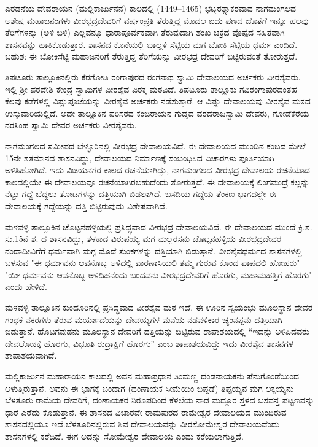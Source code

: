 ಎರಡನೆಯ ದೇವರಾಯನ (ಮಲ್ಲಿಕಾರ್ಜುನನ) ಕಾಲದಲ್ಲಿ (1449–1465) ಭಟ್ಟರತ್ನಾಕರವಾದ ನಾಗಮಂಗಲದ ಅಶೇಷ ಮಹಾಜನಂಗಳು ವೀರಭದ್ರದೇವರಿಗೆ ವರ್ಷಂಪ್ರತಿ ತೆರುತ್ತಿದ್ದ ಮೊದಲ ಐದು ಪಣದ ಜೊತೆಗೆ ಇನ್ನೂ ಹಲವು ತೆರಿಗೆಗಳನ್ನು (ಅಳಿ ಬಳಿ) ಎಲ್ಲವನ್ನೂ ಧಾರಾಪೂರ್ವಕವಾಗಿ ತೆರುವುದಾಗಿ ಶಂಖ ಚಕ್ರದ ವೊಪ್ಪದ ಸಹಿತವಾಗಿ ಶಾಸನವನ್ನು ಹಾಕಿಕೊಡುತ್ತಾರೆ. ಶಾಸನದ ಕೊನೆಯಲ್ಲಿ ಬಾಲ್ದಳಿ ಸೆಟ್ಟಿಯ ಮಗ ಬೋಕಿ ಸೆಟ್ಟಿಯ ಧರ್ಮ ಎಂದಿದೆ. ಬಹುಶ: ಈ ಬೋಕಿಸೆಟ್ಟಿ ಮಹಾಜನರಿಗೆ ತೆರುತ್ತಿದ್ದ ತೆರಿಗೆಯನ್ನು ವೀರಭದ್ರ ದೇವರಿಗೆ ಬಿಟ್ಟಿರುವಂತೆ ತೋರುತ್ತದೆ.

ತಿಪಟೂರು ತಾಲ್ಲೂಕಿನಲ್ಲಿರು ಕೆರಗೋಡಿ ರಂಗಾಪುರದ ರಂಗನಾಥ ಸ್ವಾಮಿ ದೇವಾಲಯದ ಅರ್ಚಕರು ವೀರಶೈವರು. ಇಲ್ಲಿ ಶ‍್ರೀ ಪರದೇಶಿ ಕೇಂದ್ರ ಸ್ವಾಮಿಗಳ ವೀರಶೈವ ವಿರಕ್ತ ಮಠವಿದೆ. ತಿಪಟೂರು ತಾಲ್ಲೂಕು ಗವಿರಂಗಾಪುರದಂತಹ ಕೆಲವು ಕಡೆಗಳಲ್ಲಿ ವಿಷ್ಣುಪೂಜೆಯನ್ನು ವೀರಶೈವ ಅರ್ಚಕರು ನಡೆಸುತ್ತಾರೆ. ಆ ವಿಷ್ಣು ದೇವಾಲಯವು ವೀರಶೈವ ಮಠದ ಉಸ್ತುವಾರಿಯಲ್ಲಿದೆ. ಅದೇ ತಾಲ್ಲೂಕಿನ ಪರಿಸರದ ಕಂಚಿರಾಯನ ಗುಡ್ಡದ ವರದರಾಜಸ್ವಾಮಿ ದೇವರು, ಗೋಡೆಕೆರೆಯ ನರಸಿಂಹ ಸ್ವಾಮಿ ದೇವರ ಅರ್ಚಕರು ವೀರಶೈವರು.

ನಾಗಮಂಗಲದ ಸಮೀಪದ ಬೆಳ್ಳೂರಿನಲ್ಲಿ ವೀರಭದ್ರ ದೇವಾಲಯವಿದೆ. ಈ ದೇವಾಲಯದ ಮುಂದಿನ ಕಂಬದ ಮೇಲೆ 15ನೇ ಶತಮಾನದ ಶಾಸನವಿದ್ದು, ದೇವಾಲಯದ ನಿರ್ಮಾಣಕ್ಕೆ ಸಂಬಂಧಿಸಿದ ವಿಚಾರಗಳು ಪೂರ್ತಿಯಾಗಿ ಅಳಿಸಿಹೋಗಿದೆ. ಇದು ವಿಜಯನಗರ ಕಾಲದ ರಚನೆಯಾಗಿದ್ದು, ನಾಗಮಂಗಲದ ವೀರಭದ್ರ ದೇವಾಲಯ ರಚನೆಯಾದ ಕಾಲದಲ್ಲಿಯೇ ಈ ದೇವಾಲಯವೂ ರಚನೆಯಾಗಿರಬಹುದೆಂದು ತೋರುತ್ತದೆ. ಈ ದೇವಾಲಯಕ್ಕೆ ಲಿಂಗಮುದ್ರೆ ಕಲ್ಲನ್ನು ನೆಟ್ಟು ಗದ್ದೆ ಬೆದ್ದಲು ತೋಟಗಳನ್ನು ದತ್ತಿಯಾಗಿ ಬಿಡಲಾಗಿದೆ. ಬಸದಿಯ ಗದ್ದೆಯ ತೆಂಕಣ ಭಾಗದಲ್ಲೇ ಈ ದೇವಾಲಯಕ್ಕೆ ಗದ್ದೆಯನ್ನು ದತ್ತಿ ಬಿಟ್ಟಿರುವುದು ವಿಶೇಷವಾಗಿದೆ.

ಮಳವಳ್ಳಿ ತಾಲ್ಲೂಕಿನ ಚೊಟ್ಟನಹಳ್ಳಿಯಲ್ಲಿ ಪ್ರಸಿದ್ಧವಾದ ವೀರಭದ್ರ ದೇವಾಲಯವಿದೆ. ಈ ದೇವಾಲಯದ ಮುಂದೆ ಕ್ರಿ.ಶ. ಸು.15ನೆ ಶ. ದ ಶಾಸನವಿದ್ದು, ತಳಕಾಡ ವಿರುಪಯ್ಯ ಮಗ ಮಲ್ಲರಸನು ಚೊಟ್ಟನಹಳ್ಳಿಯ ವೀರಭದ್ರದೇವರ ನಂದಾದೀವಿಗೆಗೆ ಧರ್ಮವಾಗಿ ಮಗ್ಗ ಮೊದೆ ಸುಂಕಗಳನ್ನು ದತ್ತಿಯಾಗಿ ಬಿಡುತ್ತಾನೆ. ವೀರಶೈವಧರ್ಮದ ಶಾಸನಗಳಲ್ಲಿ ಬಳಸುವ "ಈ ಧರ್ಮವನು ಆವನೊಬ್ಬ ಅಳಿದಲ್ಲಿ ವಾರಣಾಸಿಯಲಿ ತಮ್ಮ ಗುರುವ ಕೊಂದ ಪಾಪದಲಿ ಹೋಹರು" "ಯೀ ಧರ್ಮವನು ಆವನೊಬ್ಬ ಅಳಿದಿಹನೆಂದು ಬಂದವನು ವೀರಭದ್ರದೇವರಿಗೆ ಹೊರಗು, ಮಹಾಮಹತ್ತಿಗೆ ಹೊರಗು" ಎಂದು ಹೇಳಿದೆ.

ಮಳವಳ್ಳಿ ತಾಲ್ಲೂಕಿನ ಕುಂದೂರಿನಲ್ಲಿ ಪ್ರಸಿದ್ಧವಾದ ವೀರಶೈವ ಮಠ ಇದೆ. ಈ ಊರಿನ ಸ್ವಯಂಭು ಮೂಲಸ್ಥಾನ ದೇವರ ಗಂಧಕೆ ನಕರಗಳು ತೆರುವ ಮರ್ಯಾದೆಯನ್ನು ದೇವಯ್ಯಗಳ ಮನೆಯ ನಡವಳಿಕಾರ ಚ್ಯಂನಪ್ಪನು ದತ್ತಿಯಾಗಿ ಬಿಡುತ್ತಾನೆ. ಹೊಟಗವುಡನು ಮೂಲಸ್ಥಾನ ದೇವರಿಗೆ ದತ್ತಿಯನ್ನು ಬಿಟ್ಟಿರುವ ಶಾಪಾಶಯದಲ್ಲಿ “ಇದನ್ನು ಅಳಿಪಿದವರು ದೇವಲೋಕಕ್ಕೆ ಹೊರಗು, ವಿಭೂತಿ ರುದ್ರಾಕ್ಷಿಗೆ ಹೊರಗು” ಎಂಬ ಶಾಪಾಶಯವಿದ್ದು ಇದು ವೀರಶೈವ ಶಾಸನಗಳ ಶಾಪಾಶಯವಾಗಿದೆ.

ಮಲ್ಲಿಕಾರ್ಜುನ ಮಹಾರಾಯನ ಕಾಲದಲ್ಲಿ ಅವನ ಮಹಾಪ್ರಧಾನ ತಿಂಮಣ್ಣ ದಂಡನಾಯಕನು ಪೆನುಗೊಂಡೆಯಿಂದ ಆಳುತ್ತಿರುತ್ತಾನೆ. ಅವನು ಈ ಭಾಗಕ್ಕೆ ಬಂದಾಗ (ದಂಣಾಯಕ ಸೀಮೆಯಿಂ ಬಪ್ಪಡೆ) ತಿಪ್ಪಯ್ಯನ ಮಗ ಲಕ್ಕಯ್ಯನು ಬೆಳತೂರು ರಾಮೆಯ ದೇವರಿಗೆ, ದಂಣಾಯಕರ ನಿರೂಪದಿಂದ ಕೆಳಲೆಯ ನಾಡ ಮದ್ದೂರ ಸ್ತಳದ ಬಸವನ್ತ ಪಟ್ಟಣವನ್ನು ಧಾರೆ ಎರೆದು ಕೊಡುತ್ತಾನೆ. ಈ ಶಾಸನದ ವಿಚಾರವೇ ರಾಮಪುರದ ರಾಮೇಶ್ವರ ದೇವಾಲಯದ ಮುಂದಿರುವ ಶಾಸನದಲ್ಲಿಯೂ ಇದೆ.ಬೆಳತೂರಿನಲ್ಲಿರುವ ಶಿವ ದೇವಾಲಯವನ್ನು ವೀರಸೋಮೇಶ್ವರ ದೇವಾಲಯವೆಂದು ಶಾಸನಗಳಲ್ಲಿ ಕರೆದಿದೆ. ಈಗ ಅದನ್ನು ಸೋಮೇಶ್ವರ ದೇವಾಲಯ ಎಂದು ಕರೆಯಲಾಗುತ್ತಿದೆ.

